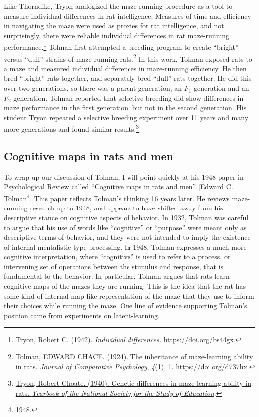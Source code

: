 \documentclass[
  oneside,
  12pt]{crumpbook}
\begin{document}
Like Thorndike, Tryon analogized the maze-running procedure as a tool to measure individual differences in rat intelligence. Measures of time and efficiency in navigating the maze were used as proxies for rat intelligence, and not surprisingly, there were reliable individual differences in rat maze-running performance.\footnote{\protect\hyperlink{ref-tryonIndividualDifferences1942}{Tryon, Robert C. (1942). \emph{Individual differences.} \url{https://doi.org/bs44gx}}.} Tolman first attempted a breeding program to create ``bright'' versus ``dull'' strains of maze-running rats.\footnote{\protect\hyperlink{ref-tolmanInheritanceMazelearningAbility1924}{Tolman, EDWARD CHACE. (1924). The inheritance of maze-learning ability in rats. \emph{Journal of Comparative Psychology}, \emph{4}(1), 1. \url{https://doi.org/d737hx}}.} In this work, Tolman exposed rats to a maze and measured individual differences in maze-running efficiency. He then bred ``bright'' rats together, and separately bred ``dull'' rats together. He did this over two generations, so there was a parent generation, an \(F_1\) generation and an \(F_2\) generation. Tolman reported that selective breeding did show differences in maze performance in the first generation, but not in the second generation. His student Tryon repeated a selective breeding experiment over 11 years and many more generations and found similar results.\footnote{\protect\hyperlink{ref-tryonGeneticDifferencesMaze1940}{Tryon, Robert Choate. (1940). Genetic differences in maze learning ability in rats. \emph{Yearbook of the National Society for the Study of Education}}.}

\hypertarget{cognitive-maps-in-rats-and-men}{%
\subsection{Cognitive maps in rats and men}\label{cognitive-maps-in-rats-and-men}}

To wrap up our discussion of Tolman, I will point quickly at his 1948 paper in Psychological Review called ``Cognitive maps in rats and men'' {[}Edward C. Tolman\footnote{\protect\hyperlink{ref-tolmanCognitiveMapsRats1948}{1948}.}. This paper reflects Tolman's thinking 16 years later. He reviews maze-running research up to 1948, and appears to have shifted away from his descriptive stance on cognitive aspects of behavior. In 1932, Tolman was careful to argue that his use of words like ``cognitive'' or ``purpose'' were meant only as descriptive terms of behavior, and they were not intended to imply the existence of internal mentalistic-type processing. In 1948, Tolman expresses a much more cognitive interpretation, where ``cognitive'' is used to refer to a process, or intervening set of operations between the stimulus and response, that is fundamental to the behavior. In particular, Tolman argues that rats learn cognitive maps of the mazes they are running. This is the idea that the rat has some kind of internal map-like representation of the maze that they use to inform their choices while running the maze. One line of evidence supporting Tolman's position came from experiments on latent-learning.
\end{document}
